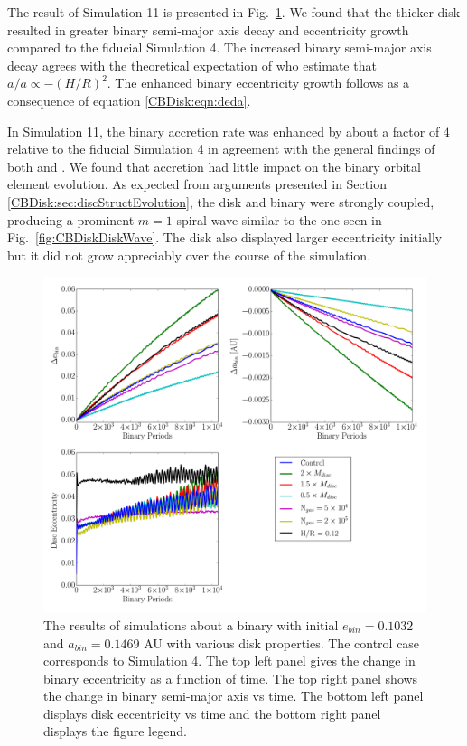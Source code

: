 The result of Simulation 11 is presented in Fig.~\ref{fig:CBDiskVarying}.  We found that the thicker disk resulted in greater binary semi-major axis decay and 
eccentricity growth compared to the fiducial Simulation 4.  The increased binary semi-major axis decay agrees with the theoretical expectation of 
\citet{Artymowicz1996b,Artymowicz2000} who estimate that $\dot{a}/a \propto -(H/R)^2$.  The enhanced binary eccentricity growth follows as a consequence of equation 
\ref{CBDisk:eqn:deda}.

In Simulation 11, the binary accretion rate was enhanced by about a factor of $4$ relative to the fiducial Simulation 4 in agreement with the general 
findings of both \citet{Young2015} and \citet{Ragusa2016}.  We found that accretion had little impact on the binary orbital element evolution.  As expected from arguments presented in Section \ref{CBDisk:sec:discStructEvolution}, the disk and binary were strongly coupled, producing a prominent $m = 1$ spiral wave similar to the one seen in Fig.~\ref{fig:CBDiskDiskWave}.  The disk also displayed larger eccentricity initially but it did not grow appreciably over the course of the 
simulation.  
	
\begin{figure}
	\includegraphics[width=\textwidth]{f9}
    \caption{The results of simulations about a binary with initial $e_{bin} = 0.1032$ and $a_{bin} = 0.1469$ AU with various disk properties.  The control case corresponds to Simulation 4.  The top left panel gives the change in binary eccentricity as a function of time.  The top right panel shows the change in binary semi-major axis vs time.  The bottom left panel displays disk eccentricity vs time and the bottom right panel displays the figure legend.}
    \label{fig:CBDiskVarying}
\end{figure}
	
